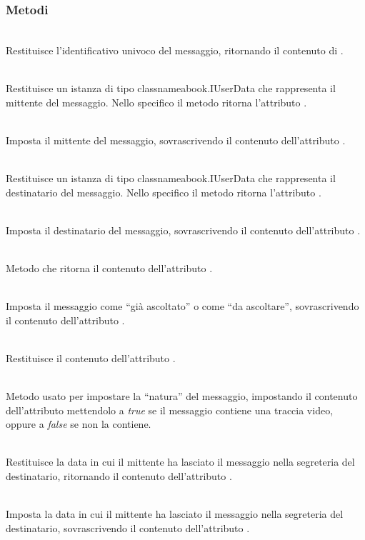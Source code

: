 \subsubsection*{Metodi}
\begin{description}
	\item{}\\
	Restituisce l'identificativo univoco del messaggio, ritornando il contenuto di .
	\item{}\\
	Restituisce un istanza di tipo classname{abook.IUserData} che rappresenta il mittente del messaggio. Nello specifico il metodo ritorna l'attributo .
	\item{}\\
	Imposta il mittente del messaggio, sovrascrivendo il contenuto dell'attributo .
	\item{}\\
	Restituisce un istanza di tipo classname{abook.IUserData} che rappresenta il destinatario del messaggio. Nello specifico il metodo ritorna l'attributo .
	\item{}\\
	Imposta il destinatario del messaggio, sovrascrivendo il contenuto dell'attributo .
	\item{}\\
	Metodo che ritorna il contenuto dell'attributo .
	\item{}\\
	Imposta il messaggio come ``già ascoltato'' o come ``da ascoltare'', sovrascrivendo il contenuto dell'attributo .
	\item{}\\
	Restituisce il contenuto dell'attributo .
	\item{}\\	
	Metodo usato per impostare la ``natura'' del messaggio, impostando il contenuto dell'attributo  mettendolo a \textit{true} se il messaggio contiene una traccia video, oppure a \textit{false} se non la contiene.
	\item{}\\
	Restituisce la data in cui il mittente ha lasciato il messaggio nella segreteria del destinatario, ritornando il contenuto dell'attributo .
	\item{}\\
	Imposta la data in cui il mittente ha lasciato il messaggio nella segreteria del destinatario, sovrascrivendo il contenuto dell'attributo .

\end{description}

